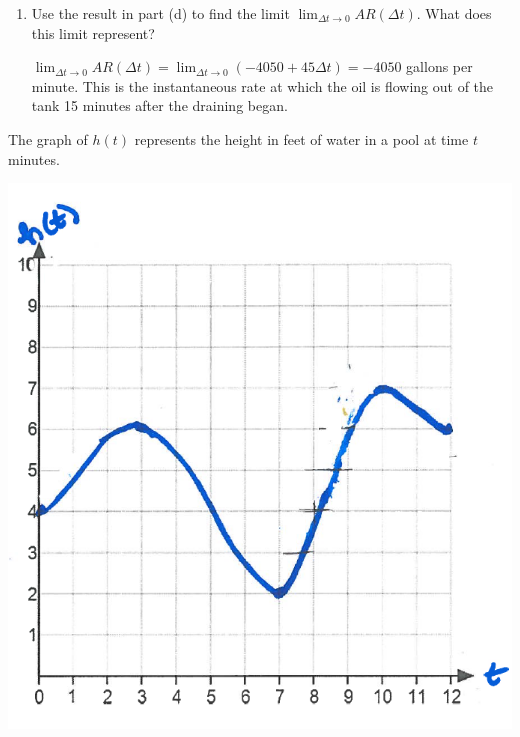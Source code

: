 \documentclass[nooutcomes,handout]{ximera}
\begin{document}
\begin{problem}
\begin{enumerate}
		\item Use the result in part (d) to find the limit $\lim_{\Delta t \to 0} AR(\Delta t)$.  What does this limit represent?
			\begin{freeResponse}
			$\lim_{\Delta t \to 0} AR(\Delta t)=\lim_{\Delta t \to 0} (-4050+45\Delta t) =-4050$ gallons per minute.  This is the instantaneous rate at which the oil is flowing out of the tank 15 minutes after the draining began.
			\end{freeResponse}
	\end{enumerate}
	


\end{problem}


\begin{problem}
The graph of $h(t)$ represents the height in feet of water in a pool at time $t$ minutes.
			\begin{image}
			\includegraphics[scale=.5]{Figure7.png}
			\end{image}
	


\end{problem}
\end{document}

